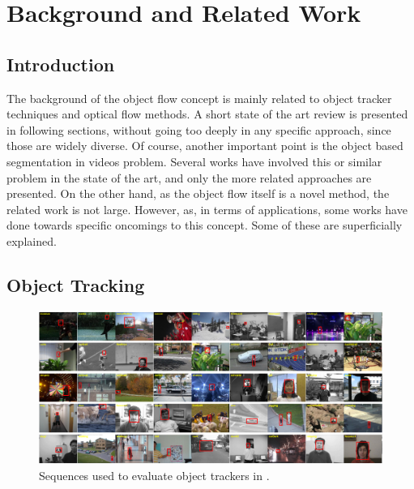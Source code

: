 \chapter{Background and Related Work} \label{chap:background}

\section{Introduction}

The background of the object flow concept is mainly related to object tracker techniques and optical flow methods. A short state of the art review is presented in 
following sections, without going too deeply in any specific approach, since those are widely diverse. Of course, another important point is the object based segmentation in videos problem. Several works have involved this or similar problem in 
the state of the art, and only the more related approaches are presented. On the other hand, as the object flow itself is a novel method, the related work is not large.
 However, as, in terms of applications, some works have done towards specific oncomings to this concept. Some of these are superficially explained.

\section{Object Tracking}

   \begin{figure}[thpb]
      \centering
      \includegraphics[width=1.0\textwidth]{../images/tr_db.png}
      \caption{Sequences used to evaluate object trackers in \cite{c16}. }
      \label{tr_db}
   \end{figure}

